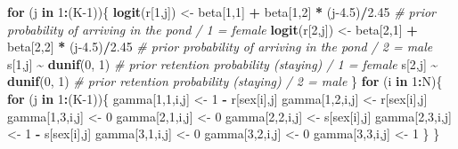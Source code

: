 \documentclass[
  12pt,
]{krantz}
\newenvironment{Shaded}{\begin{snugshade}}{\end{snugshade}}
\newcommand{\CommentTok}[1]{\textcolor[rgb]{0.56,0.35,0.01}{\textit{#1}}}
\newcommand{\ControlFlowTok}[1]{\textcolor[rgb]{0.13,0.29,0.53}{\textbf{#1}}}
\newcommand{\DecValTok}[1]{\textcolor[rgb]{0.00,0.00,0.81}{#1}}
\newcommand{\FloatTok}[1]{\textcolor[rgb]{0.00,0.00,0.81}{#1}}
\newcommand{\FunctionTok}[1]{\textcolor[rgb]{0.13,0.29,0.53}{\textbf{#1}}}
\newcommand{\NormalTok}[1]{#1}
\newcommand{\OtherTok}[1]{\textcolor[rgb]{0.56,0.35,0.01}{#1}}
\newcommand{\SpecialCharTok}[1]{\textcolor[rgb]{0.81,0.36,0.00}{\textbf{#1}}}
\begin{document}
\begin{Shaded}
\begin{Highlighting}[]
\ControlFlowTok{for}\NormalTok{ (j }\ControlFlowTok{in} \DecValTok{1}\SpecialCharTok{:}\NormalTok{(K}\DecValTok{{-}1}\NormalTok{))\{}
  \FunctionTok{logit}\NormalTok{(r[}\DecValTok{1}\NormalTok{,j]) }\OtherTok{\textless{}{-}}\NormalTok{ beta[}\DecValTok{1}\NormalTok{,}\DecValTok{1}\NormalTok{] }\SpecialCharTok{+}\NormalTok{ beta[}\DecValTok{1}\NormalTok{,}\DecValTok{2}\NormalTok{] }\SpecialCharTok{*}\NormalTok{ (j}\FloatTok{{-}4.5}\NormalTok{)}\SpecialCharTok{/}\FloatTok{2.45} \CommentTok{\# prior probability of arriving in the pond / 1 = female}
  \FunctionTok{logit}\NormalTok{(r[}\DecValTok{2}\NormalTok{,j]) }\OtherTok{\textless{}{-}}\NormalTok{ beta[}\DecValTok{2}\NormalTok{,}\DecValTok{1}\NormalTok{] }\SpecialCharTok{+}\NormalTok{ beta[}\DecValTok{2}\NormalTok{,}\DecValTok{2}\NormalTok{] }\SpecialCharTok{*}\NormalTok{ (j}\FloatTok{{-}4.5}\NormalTok{)}\SpecialCharTok{/}\FloatTok{2.45} \CommentTok{\# prior probability of arriving in the pond / 2 = male}
\NormalTok{  s[}\DecValTok{1}\NormalTok{,j] }\SpecialCharTok{\textasciitilde{}} \FunctionTok{dunif}\NormalTok{(}\DecValTok{0}\NormalTok{, }\DecValTok{1}\NormalTok{) }\CommentTok{\# prior retention probability (staying) / 1 = female}
\NormalTok{  s[}\DecValTok{2}\NormalTok{,j] }\SpecialCharTok{\textasciitilde{}} \FunctionTok{dunif}\NormalTok{(}\DecValTok{0}\NormalTok{, }\DecValTok{1}\NormalTok{) }\CommentTok{\# prior retention probability (staying) / 2 = male}
\NormalTok{\}}
\ControlFlowTok{for}\NormalTok{ (i }\ControlFlowTok{in} \DecValTok{1}\SpecialCharTok{:}\NormalTok{N)\{}
  \ControlFlowTok{for}\NormalTok{ (j }\ControlFlowTok{in} \DecValTok{1}\SpecialCharTok{:}\NormalTok{(K}\DecValTok{{-}1}\NormalTok{))\{}
\NormalTok{    gamma[}\DecValTok{1}\NormalTok{,}\DecValTok{1}\NormalTok{,i,j] }\OtherTok{\textless{}{-}} \DecValTok{1} \SpecialCharTok{{-}}\NormalTok{ r[sex[i],j] }
\NormalTok{    gamma[}\DecValTok{1}\NormalTok{,}\DecValTok{2}\NormalTok{,i,j] }\OtherTok{\textless{}{-}}\NormalTok{ r[sex[i],j] }
\NormalTok{    gamma[}\DecValTok{1}\NormalTok{,}\DecValTok{3}\NormalTok{,i,j] }\OtherTok{\textless{}{-}} \DecValTok{0} 
\NormalTok{    gamma[}\DecValTok{2}\NormalTok{,}\DecValTok{1}\NormalTok{,i,j] }\OtherTok{\textless{}{-}} \DecValTok{0}
\NormalTok{    gamma[}\DecValTok{2}\NormalTok{,}\DecValTok{2}\NormalTok{,i,j] }\OtherTok{\textless{}{-}}\NormalTok{ s[sex[i],j]}
\NormalTok{    gamma[}\DecValTok{2}\NormalTok{,}\DecValTok{3}\NormalTok{,i,j] }\OtherTok{\textless{}{-}} \DecValTok{1} \SpecialCharTok{{-}}\NormalTok{ s[sex[i],j]}
\NormalTok{    gamma[}\DecValTok{3}\NormalTok{,}\DecValTok{1}\NormalTok{,i,j] }\OtherTok{\textless{}{-}} \DecValTok{0} 
\NormalTok{    gamma[}\DecValTok{3}\NormalTok{,}\DecValTok{2}\NormalTok{,i,j] }\OtherTok{\textless{}{-}} \DecValTok{0} 
\NormalTok{    gamma[}\DecValTok{3}\NormalTok{,}\DecValTok{3}\NormalTok{,i,j] }\OtherTok{\textless{}{-}} \DecValTok{1}
\NormalTok{  \}}
\NormalTok{\}}
\end{Highlighting}
\end{Shaded}
\end{document}
